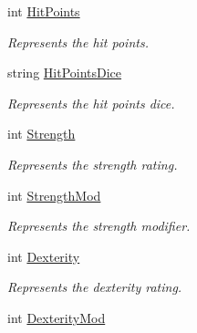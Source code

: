 \begin{DoxyCompactItemize}
int \mbox{\hyperlink{class_dungeons__n___dragons___manager_1_1_models_1_1_monster_ab2d2e180bc71c13e75ed2474e9ba4f99}{Hit\+Points}}
\begin{DoxyCompactList}\small\item\em Represents the hit points. \end{DoxyCompactList}\item 
string \mbox{\hyperlink{class_dungeons__n___dragons___manager_1_1_models_1_1_monster_a210cebf3b84358ac7fb63595f77f8453}{Hit\+Points\+Dice}}
\begin{DoxyCompactList}\small\item\em Represents the hit points dice. \end{DoxyCompactList}\item 
int \mbox{\hyperlink{class_dungeons__n___dragons___manager_1_1_models_1_1_monster_acb2e8a288876aef7f6ca433f295fe0a7}{Strength}}
\begin{DoxyCompactList}\small\item\em Represents the strength rating. \end{DoxyCompactList}\item 
int \mbox{\hyperlink{class_dungeons__n___dragons___manager_1_1_models_1_1_monster_a4d1fb3fe5f7bb6adf8328f4dcf8438cd}{Strength\+Mod}}
\begin{DoxyCompactList}\small\item\em Represents the strength modifier. \end{DoxyCompactList}\item 
int \mbox{\hyperlink{class_dungeons__n___dragons___manager_1_1_models_1_1_monster_a7495e953b8a907bbbfd855fa65efdde3}{Dexterity}}
\begin{DoxyCompactList}\small\item\em Represents the dexterity rating. \end{DoxyCompactList}\item 
int \mbox{\hyperlink{class_dungeons__n___dragons___manager_1_1_models_1_1_monster_ac8db913b7b47f98aa7594246be510c50}{Dexterity\+Mod}}

\end{DoxyCompactItemize}
